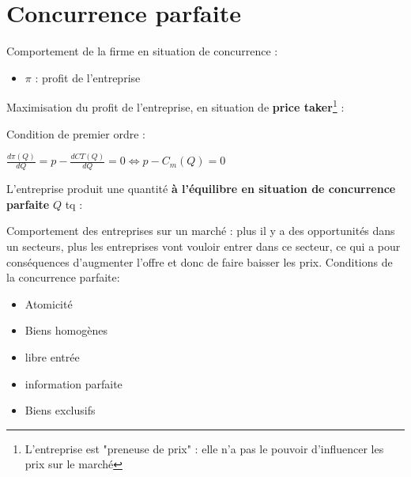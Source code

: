 \section{Concurrence parfaite}
Comportement de la firme en situation de concurrence :
\begin{itemize}
    \item $\pi$ : profit de l'entreprise
\end{itemize}
Maximisation du profit de l'entreprise, en situation de \textbf{price taker}\footnote{L'entreprise est "preneuse de prix" : elle n'a pas le pouvoir d'influencer les prix sur le marché} : 
\begin{center}
    \Large{}
\end{center}
Condition de premier ordre :
\begin{center}
    \Large{}
\end{center}
\begin{center}
    \Large{$\frac{d\pi(Q)}{dQ} = p - \frac{dCT(Q)}{dQ} = 0 \Longleftrightarrow p - C_{m}(Q) = 0$}
\end{center}
L'entreprise produit une quantité \textbf{à l'équilibre en situation de concurrence parfaite} $Q$ tq :
\begin{center}
    \Large{}    
\end{center}


Comportement des entreprises sur un marché : plus il y a des opportunités dans un secteurs, plus les entreprises vont vouloir entrer dans ce secteur, ce qui a pour conséquences d'augmenter l'offre et donc de faire baisser les prix. \newline
Conditions de la concurrence parfaite:
\begin{center}
    \begin{itemize}
    \item Atomicité
    \item Biens homogènes
    \item libre entrée
    \item information parfaite
    \item Biens exclusifs
\end{itemize}
\end{center}
\newpage
